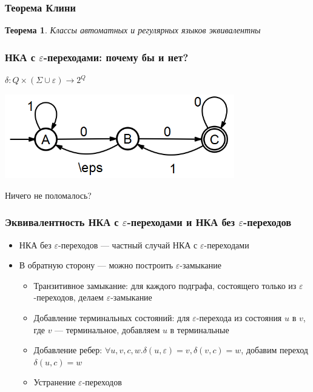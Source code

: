 \documentclass{beamer}
\newtheorem{rutheorem}{Теорема}
\begin{document}
\begin{frame}[fragile]
  \transwipe[direction=90]
  \frametitle{Теорема Клини}
  \begin{rutheorem}
   Классы автоматных и регулярных языков \emph{эквивалентны}
  \end{rutheorem}
\end{frame}


\begin{frame}[fragile]
  \transwipe[direction=90]
  \frametitle{НКА с $\varepsilon$-переходами: почему бы и нет?}
  $\delta: Q \times (\Sigma \cup \varepsilon) \rightarrow 2^Q$
  
  \begin{center}
    \includegraphics[width=0.75\textwidth]{pics/eps.png}  
  \end{center}
  
  Ничего не поломалось?
\end{frame}

\begin{frame}[fragile]
  \transwipe[direction=90]
  \frametitle{Эквивалентность НКА с $\varepsilon$-переходами и НКА без $\varepsilon$-переходов }
  \begin{itemize}
    \item НКА без $\varepsilon$-переходов --- частный случай НКА с $\varepsilon$-переходами
    \item В обратную сторону --- можно построить $\varepsilon$-замыкание
    \begin{itemize}
      \item Транзитивное замыкание: для каждого подграфа, состоящего только из $\varepsilon$-переходов, делаем $\varepsilon$-замыкание
      \item Добавление терминальных состояний: для $\varepsilon$-перехода из состояния $u$ в $v$, где $v$ --- терминальное, добавляем $u$ в терминальные
      \item Добавление ребер: $\forall u, v, c, w. \delta(u,\varepsilon)=v, \delta(v,c)=w$, добавим переход $\delta(u,c)=w$
      \item Устранение $\varepsilon$-переходов
    \end{itemize}
  \end{itemize}
\end{frame}
\end{document}
